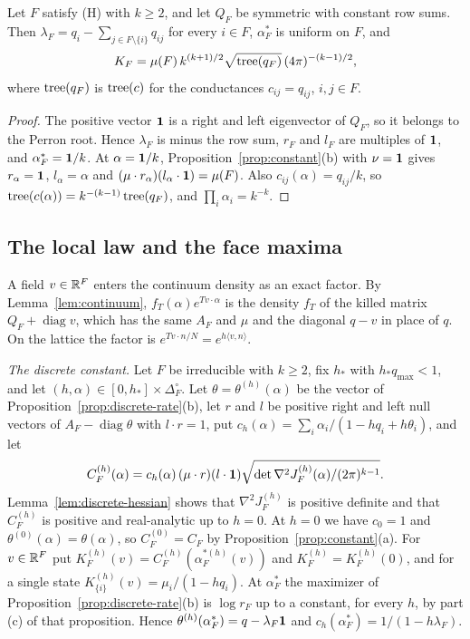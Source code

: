 \begin{corollary}\label{cor:symface}
Let $F$ satisfy \textup{(H)} with $k\ge2$, and let $Q_F$ be symmetric with constant row sums.
Then $\lambda_F=q_i-\sum_{j\in F\setminus\{i\}}q_{ij}$ for every $i\in F$, $\alpha^*_F$ is uniform
on $F$, and
\[
K_F=\mu(F)\,k^{(k+1)/2}\sqrt{\operatorname{tree}(q_F)}\,(4\pi)^{-(k-1)/2},
\]
where $\operatorname{tree}(q_F)$ is $\operatorname{tree}(c)$ for the conductances $c_{ij}=q_{ij}$, $i,j\in F$.
\end{corollary}

\begin{proof}
The positive vector $\mathbf{1}$ is a right and left eigenvector of $Q_F$, so it belongs to the
Perron root. Hence $\lambda_F$ is minus the row sum, $r_F$ and $l_F$ are multiples of $\mathbf{1}$, and
$\alpha^*_F=\mathbf{1}/k$.
At $\alpha=\mathbf{1}/k$, Proposition~\ref{prop:constant}(b) with $\nu=\mathbf{1}$ gives
$r_\alpha=\mathbf{1}$, $l_\alpha=\alpha$ and $(\mu\cdot r_\alpha)(l_\alpha\cdot\mathbf{1})=\mu(F)$.
Also $c_{ij}(\alpha)=q_{ij}/k$, so $\operatorname{tree}(c(\alpha))=k^{-(k-1)}\operatorname{tree}(q_F)$, and
$\prod_i\alpha_i=k^{-k}$.
\end{proof}

\subsection{The local law and the face maxima}\label{sec:locallaw}

A field $v\in\mathbb{R}^F$ enters the continuum density as an exact factor. By
Lemma~\ref{lem:continuum}, $f_T(\alpha)e^{Tv\cdot\alpha}$ is the density $f_T$ of
the killed matrix $Q_F+\operatorname{diag}v$, which has the same $A_F$ and $\mu$ and
the diagonal $q-v$ in place of $q$. On the lattice the factor is
$e^{Tv\cdot n/N}=e^{h\langle v,n\rangle}$.

\emph{The discrete constant.} Let $F$ be irreducible with $k\ge2$, fix $h_*$ with
$h_*q_{\max}<1$, and let
$(h,\alpha)\in[0,h_*]\times\Delta_F^\circ$. Let $\theta=\theta^{(h)}(\alpha)$ be the
vector of Proposition~\ref{prop:discrete-rate}(b), let $r$ and $l$ be positive right
and left null vectors of $A_F-\operatorname{diag}\theta$ with $l\cdot r=1$, put
$c_h(\alpha)=\sum_i\alpha_i/(1-hq_i+h\theta_i)$, and let
\[
 C^{(h)}_F(\alpha)=c_h(\alpha)\,(\mu\cdot r)(l\cdot\mathbf{1})
 \sqrt{\det\nabla^2J^{(h)}_F(\alpha)/(2\pi)^{k-1}} .
\]
Lemma~\ref{lem:discrete-hessian} shows that $\nabla^2J^{(h)}_F$ is positive definite
and that $C^{(h)}_F$ is positive and real-analytic up to $h=0$. At $h=0$ we have
$c_0=1$ and $\theta^{(0)}(\alpha)=\theta(\alpha)$, so $C^{(0)}_F=C_F$ by
Proposition~\ref{prop:constant}(a). For $v\in\mathbb{R}^F$ put
$K^{(h)}_F(v)=C^{(h)}_F(\alpha^{*(h)}_F(v))$ and $K^{(h)}_F=K^{(h)}_F(0)$, and for a
single state $K^{(h)}_{\{i\}}(v)=\mu_i/(1-hq_i)$. At $\alpha^*_F$ the maximizer of
Proposition~\ref{prop:discrete-rate}(b) is $\log r_F$ up to a constant, for every
$h$, by part (c) of that proposition. Hence
$\theta^{(h)}(\alpha^*_F)=q-\lambda_F\mathbf{1}$ and
$c_h(\alpha^*_F)=1/(1-h\lambda_F)$.

